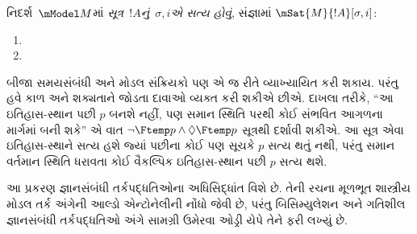 \begin{defn}
  નિદર્શ~$\mModel M$માં \emph{સૂત્ર~$!A$નું~$\sigma,i$એ સત્ય હોવું},
  સંજ્ઞામાં $\mSat{M}{!A}[\sigma,i]$:
  \begin{enumerate}
  \item{} 
  \item{} 
  \end{enumerate} 
\end{defn}


બીજા સમયસંબંધી અને મોડલ સંક્રિયકો પણ એ જ રીતે વ્યાખ્યાયિત કરી
શકાય. પરંતુ હવે કાળ અને શક્યતાને જોડતા દાવાઓ વ્યક્ત કરી શકીએ છીએ.
દાખલા તરીકે, ``આ ઇતિહાસ-સ્થાન પછી $p$ બનશે નહીં, પણ સમાન
સ્થિતિ પરથી કોઈ સંભવિત આગળના માર્ગમાં બની શકે'' એ વાત
$\lnot \Ftemp p \land \Diamond \Ftemp p$ સૂત્રથી દર્શાવી શકીએ.
આ સૂત્ર એવા ઇતિહાસ-સ્થાને સત્ય હશે જ્યાં પછીના કોઈ પણ સૂચકે
$p$ સત્ય થતું નથી, પરંતુ સમાન વર્તમાન સ્થિતિ ધરાવતા કોઈ
વૈકલ્પિક ઇતિહાસ-સ્થાન પછી $p$ સત્ય થશે.
\endgroup


\OLEndPartHook
\endgroup


\begingroup
\makeatletter{}\makeatother

\label{guunit:OLP-0482}


\begin{editorial}
  આ પ્રકરણ જ્ઞાનસંબંધી તર્કપદ્ધતિઓના અધિસિદ્ધાંત વિશે છે. તેની
  રચના મૂળભૂત શાસ્ત્રીય મોડલ તર્ક અંગેની આલ્ડો એન્ટોનેલીની નોંધો
  જેવી છે, પરંતુ બિસિમ્યુલેશન અને ગતિશીલ જ્ઞાનસંબંધી તર્કપદ્ધતિઓ
  અંગે સામગ્રી ઉમેરવા ઓડ્રી યેપે તેને ફરી લખ્યું છે.
\end{editorial}

